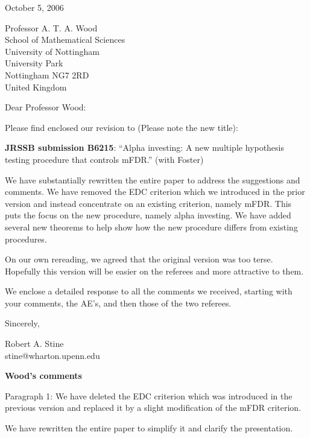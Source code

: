 \documentclass[12pt]{letter}
\begin{document}
\noindent
October 5, 2006

\vspace{0.3in}

\noindent
Professor A. T. A. Wood\\
School of Mathematical Sciences \\
University of Nottingham \\
University Park \\
Nottingham NG7 2RD \\  
United Kingdom

\vspace{0.3in}

\noindent
Dear Professor Wood: 

\noindent
Please find enclosed our revision to (Please note the new title):

\noindent
{\bf JRSSB submission B6215}: ``Alpha investing: A new multiple
hypothesis testing procedure that controls mFDR.'' (with Foster)

\noindent
We have substantially rewritten the entire paper to address the
suggestions and comments.  We have removed the EDC criterion which we
introduced in the prior version and
instead concentrate on an existing criterion, namely mFDR.  This puts
the focus on the new procedure, namely alpha investing.  We have
added several new theorems to help show how the new procedure differs
from existing procedures.

On our own rereading, we agreed that the original version was too
terse.  Hopefully this version will be easier on the referees and more
attractive to them.

We enclose a detailed response to all the comments we received,
starting with your comments, the AE's, and then those of the two referees.

\vspace{0.3in}
\noindent
Sincerely,
\vspace{0.3in}

\noindent
Robert A. Stine  \\
stine@wharton.upenn.edu



\newpage
\centerline{\bf Wood's comments}

Paragraph 1: We have deleted the EDC criterion which was introduced
in the previous version and replaced it by
 a slight modification of the mFDR criterion.  

We have rewritten the entire paper to simplify it and clarify the
presentation. 
\end{document}
